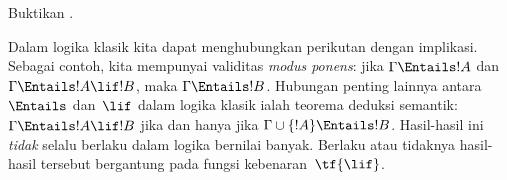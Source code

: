 \documentclass[../../../include/open-logic-section]{subfiles}
\begin{document}
\begin{prob}
Buktikan .
\end{prob}

Dalam logika klasik kita dapat menghubungkan perikutan dengan implikasi.
Sebagai contoh, kita mempunyai validitas \emph{modus ponens}: jika
$\Gamma\Entails !A$ dan $\Gamma\Entails !A\lif !B$, maka
$\Gamma\Entails !B$. Hubungan penting lainnya antara $\Entails$ dan~$\lif$
dalam logika klasik ialah teorema deduksi semantik:
$\Gamma\Entails !A\lif !B$ jika dan hanya jika
$\Gamma\cup\{!A\}\Entails !B$. Hasil-hasil ini \emph{tidak} selalu berlaku
dalam logika bernilai banyak. Berlaku atau tidaknya hasil-hasil tersebut
bergantung pada fungsi kebenaran~$\tf{\lif}$.
\end{document}
